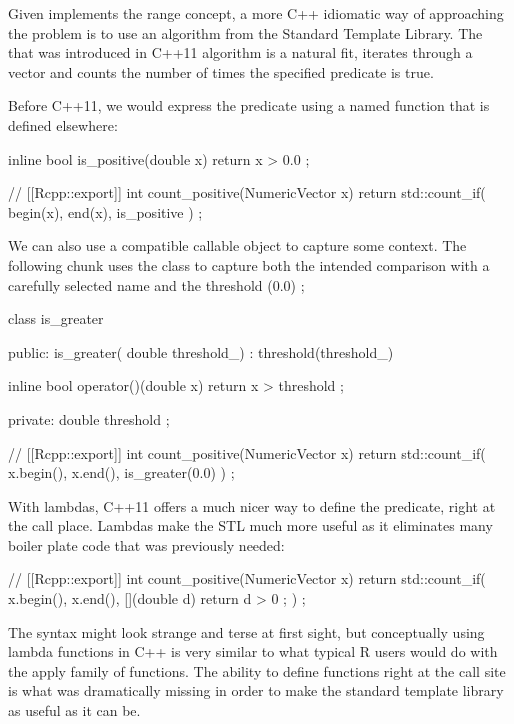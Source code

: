 Given  implements the range concept, a more C++ idiomatic
way of approaching the problem is to use an algorithm from the Standard
Template Library. The  that was introduced
in C++11 algorithm is a natural fit,  iterates through a vector
and counts the number of times the specified predicate is true. 

Before C++11, we would express the predicate using a named function that is defined
elsewhere: 

\begin{example}
inline bool is_positive(double x){
  return x > 0.0 ;
}

// [[Rcpp::export]]
int count_positive(NumericVector x){
  return std::count_if( begin(x), end(x), is_positive ) ;
}
\end{example}

We can also use a compatible callable object to capture some context. The 
following chunk uses the  class to capture both the 
intended comparison with a carefully selected name and the threshold (0.0) ;

\begin{example}
class is_greater {
public:
  is_greater( double threshold_) : threshold(threshold_){}
  
  inline bool operator()(double x){
    return x > threshold ;
  }
  
private:
  double threshold ;
}
// [[Rcpp::export]]
int count_positive(NumericVector x){
  return std::count_if( x.begin(), x.end(), is_greater(0.0) ) ;
}
\end{example}

With lambdas, C++11 offers a much nicer way to define the predicate, right at the 
call place. Lambdas make the STL much more useful as it eliminates 
many boiler plate code that was previously needed:

\begin{example}
// [[Rcpp::export]]
int count_positive(NumericVector x){
  return std::count_if( x.begin(), x.end(), 
    [](double d){ return d > 0 ;}
  ) ;
}
\end{example}

The syntax might look strange and terse at first sight, but conceptually 
using lambda functions in C++ is very similar to what typical R users
would do with the apply family of functions. The ability to define 
functions right at the call site is what was dramatically missing in order
to make the standard template library as useful as it can be. 

